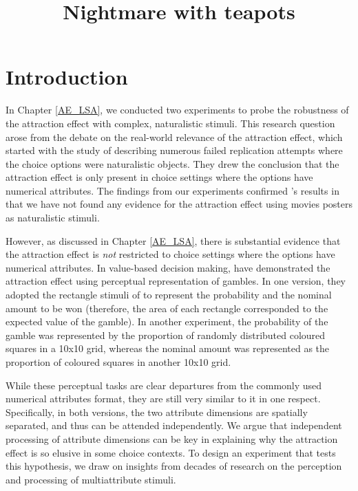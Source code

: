 \documentclass[11pt,a4paper]{article}
\date{}
\title{\huge{Nightmare with teapots}}
\begin{document}
\maketitle


\section{Introduction} 

In Chapter \ref{AE_LSA}, we conducted two experiments to probe the robustness of the attraction effect with complex, naturalistic stimuli. This research question arose from the debate on the real-world relevance of the attraction effect, which started with the study of  describing numerous failed replication attempts where the choice options were naturalistic objects. They drew the conclusion that the attraction effect is only present in choice settings where the options have numerical attributes. The findings from our experiments confirmed \citeauthor{Frederick2014}'s results in that we have not found any evidence for the attraction effect using movies posters as naturalistic stimuli.

However, as discussed in Chapter  \ref{AE_LSA}, there is substantial evidence that the attraction effect is \textit{not} restricted to choice settings where the options have numerical attributes. In value-based decision making,  have demonstrated the attraction effect using perceptual representation of gambles. In one version, they adopted the rectangle stimuli of  to represent the probability and the nominal amount to be won (therefore, the area of each rectangle corresponded to the expected value of the gamble). In another experiment, the probability of the gamble was represented by the proportion of randomly distributed coloured squares in a 10x10 grid, whereas the nominal amount was represented as the proportion of coloured squares in another 10x10 grid. 

While these perceptual tasks are clear departures from the commonly used numerical attributes format, they are still very similar to it in one respect. Specifically, in both versions, the two attribute dimensions are spatially separated, and thus can be attended independently. We argue that independent processing of attribute dimensions can be key in explaining why the attraction effect is so elusive in some choice contexts. To design an experiment that tests this hypothesis, we draw on insights from decades of research on the perception and processing of multiattribute stimuli.
\end{document}
